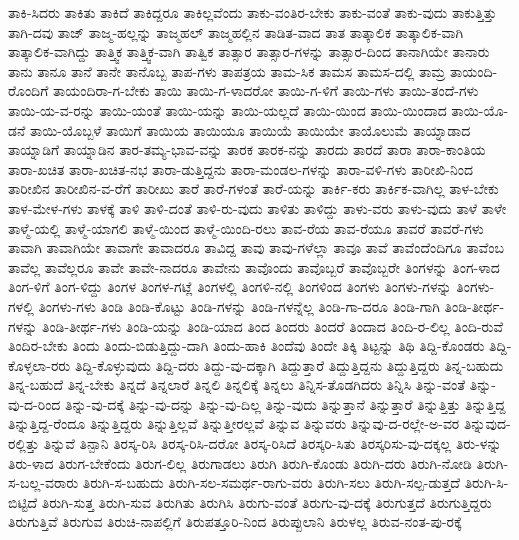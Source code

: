 {ತಾಕಿ-ಸಿದರು
ತಾಕಿತು
ತಾಕಿದೆ
ತಾಕಿದ್ದರೂ
ತಾಕಿಲ್ಲವೆಂದು
ತಾಕು-ವಂತಿರ-ಬೇಕು
ತಾಕು-ವಂತೆ
ತಾಕು-ವುದು
ತಾಕುತ್ತಿತ್ತು
ತಾಗಿ-ದವು
ತಾಜ್
ತಾಜ್ಮ-ಹಲ್ಲನ್ನು
ತಾಜ್ಮಹಲ್
ತಾಜ್ಮಹಲ್ಲಿನ
ತಾಡಿತ-ವಾದ
ತಾತ
ತಾತ್ಕಾಲಿಕ
ತಾತ್ಕಾಲಿಕ-ವಾಗಿ
ತಾತ್ಕಾಲಿಕ-ವಾಗಿದ್ದು
ತಾತ್ತ್ವಿಕ
ತಾತ್ತ್ವಿಕ-ವಾಗಿ
ತಾತ್ವಿಕ
ತಾತ್ಸಾರ
ತಾತ್ಸಾರ-ಗಳನ್ನು
ತಾತ್ಸಾರ-ದಿಂದ
ತಾನಾಗಿಯೇ
ತಾನಾರು
ತಾನು
ತಾನೂ
ತಾನೆ
ತಾನೇ
ತಾನೊಬ್ಬ
ತಾಪ-ಗಳು
ತಾಪತ್ರಯ
ತಾಮ-ಸಿಕ
ತಾಮಸ
ತಾಮಸ-ದಲ್ಲಿ
ತಾಮ್ರ
ತಾಯಂದಿ-ರೊಂದಿಗೆ
ತಾಯಂದಿರಾ-ಗ-ಬೇಕು
ತಾಯಿ
ತಾಯಿ-ಗ-ಳಾದರೋ
ತಾಯಿ-ಗ-ಳಿಗೆ
ತಾಯಿ-ಗಳು
ತಾಯಿ-ತಂದೆ-ಗಳು
ತಾಯಿ-ಯ-ವ-ರನ್ನು
ತಾಯಿ-ಯಂತೆ
ತಾಯಿ-ಯನ್ನು
ತಾಯಿ-ಯಲ್ಲದೆ
ತಾಯಿ-ಯಿಂದ
ತಾಯಿ-ಯಿಂದಾದ
ತಾಯಿ-ಯೊ-ಡನೆ
ತಾಯಿ-ಯೊಬ್ಬಳೆ
ತಾಯಿಗೆ
ತಾಯಿಯ
ತಾಯಿಯೂ
ತಾಯಿಯೆ
ತಾಯಿಯೇ
ತಾಯೊಲುಮೆ
ತಾಯ್ನಾಡಾದ
ತಾಯ್ನಾಡಿಗೆ
ತಾಯ್ನಾಡಿನ
ತಾರ-ತಮ್ಯ-ಭಾವ-ವನ್ನು
ತಾರಕ
ತಾರಕ-ನನ್ನು
ತಾರದು
ತಾರದೆ
ತಾರಾ
ತಾರಾ-ಕಾಂತಿಯ
ತಾರಾ-ಖಚಿತ
ತಾರಾ-ಖಚಿತ-ನಭ
ತಾರಾ-ಡುತ್ತಿದ್ದನು
ತಾರಾ-ಮಂಡಲ-ಗಳನ್ನು
ತಾರಾ-ವಳಿ-ಗಳು
ತಾರೀಖಿ-ನಿಂದ
ತಾರೀಖಿನ
ತಾರೀಖಿನ-ವ-ರೆಗೆ
ತಾರೀಖು
ತಾರೆ
ತಾರೆ-ಗಳಂತೆ
ತಾರೆ-ಯನ್ನು
ತಾರ್ಕಿ-ಕರು
ತಾರ್ಕಿಕ-ವಾಗಿಲ್ಲ
ತಾಳ-ಬೇಕು
ತಾಳ-ಮೇಳ-ಗಳು
ತಾಳಕ್ಕೆ
ತಾಳಿ
ತಾಳಿ-ದಂತೆ
ತಾಳಿ-ರು-ವುದು
ತಾಳಿತು
ತಾಳಿದ್ದು
ತಾಳು-ವರು
ತಾಳು-ವುದು
ತಾಳೆ
ತಾಳೇ
ತಾಳ್ಮೆ-ಯಲ್ಲಿ
ತಾಳ್ಮೆ-ಯಾಗಲಿ
ತಾಳ್ಮೆ-ಯಿಂದ
ತಾಳ್ಮೆ-ಯಿಂದಿ-ರಲು
ತಾವ-ರೆಯ
ತಾವ-ರೆಯೂ
ತಾವರೆ
ತಾವರೆ-ಗಳು
ತಾವಾಗಿ
ತಾವಾಗಿಯೇ
ತಾವಾಗೇ
ತಾವಾದರೂ
ತಾವಿದ್ದ
ತಾವು
ತಾವು-ಗಳೆಲ್ಲಾ
ತಾವೂ
ತಾವೆ
ತಾವೆಂದೆಂದಿಗೂ
ತಾವೆಂಬ
ತಾವೆಲ್ಲ
ತಾವೆಲ್ಲರೂ
ತಾವೇ
ತಾವೇ-ನಾದರೂ
ತಾವೇನು
ತಾವೊಂದು
ತಾವೊಬ್ಬರೆ
ತಾವೊಬ್ಬರೇ
ತಿಂಗಳನ್ನು
ತಿಂಗ-ಳಾದ
ತಿಂಗ-ಳಿಗೆ
ತಿಂಗ-ಳಿದ್ದು
ತಿಂಗಳ
ತಿಂಗಳ-ಗಟ್ಲೆ
ತಿಂಗಳಲ್ಲಿ
ತಿಂಗಳಿ-ನಲ್ಲಿ
ತಿಂಗಳಿಂದ
ತಿಂಗಳು
ತಿಂಗಳು-ಗಳನ್ನು
ತಿಂಗಳು-ಗಳಲ್ಲಿ
ತಿಂಗಳು-ಗಳು
ತಿಂಡಿ
ತಿಂಡಿ-ಕೊಟ್ಟು
ತಿಂಡಿ-ಗಳನ್ನು
ತಿಂಡಿ-ಗಳನ್ನೆಲ್ಲ
ತಿಂಡಿ-ಗಾ-ದರೂ
ತಿಂಡಿ-ಗಾಗಿ
ತಿಂಡಿ-ತೀರ್ಥ-ಗಳನ್ನು
ತಿಂಡಿ-ತೀರ್ಥ-ಗಳು
ತಿಂಡಿ-ಯನ್ನು
ತಿಂಡಿ-ಯಾದ
ತಿಂದ
ತಿಂದರು
ತಿಂದರೆ
ತಿಂದಾದ
ತಿಂದಿ-ರ-ಲಿಲ್ಲ
ತಿಂದಿ-ರುವೆ
ತಿಂದಿರ-ಬೇಕು
ತಿಂದು
ತಿಂದು-ಬಿಡುತ್ತಿದ್ದು-ದಾಗಿ
ತಿಂದು-ಹಾಕಿ
ತಿಂದೆವು
ತಿಂದೇ
ತಿಕ್ಕಿ
ತಿಟ್ಟನ್ನು
ತಿಥಿ
ತಿದ್ದಿ-ಕೊಂಡರು
ತಿದ್ದಿ-ಕೊಳ್ಳಲಾ-ರರು
ತಿದ್ದಿ-ಕೊಳ್ಳುವುದು
ತಿದ್ದಿ-ದರು
ತಿದ್ದು-ವು-ದಕ್ಕಾಗಿ
ತಿದ್ದುತ್ತಾರೆ
ತಿದ್ದುತ್ತಿದ್ದನು
ತಿದ್ದುತ್ತಿದ್ದರು
ತಿನ್ನ-ಬಹುದು
ತಿನ್ನ-ಬಹುದೆ
ತಿನ್ನ-ಬೇಕು
ತಿನ್ನದೆ
ತಿನ್ನಲಾರೆ
ತಿನ್ನಲಿ
ತಿನ್ನಲಿಕ್ಕೆ
ತಿನ್ನಲು
ತಿನ್ನಿಸ-ತೊಡಗಿದರು
ತಿನ್ನಿಸಿ
ತಿನ್ನು-ವಂತೆ
ತಿನ್ನು-ವು-ದ-ರಿಂದ
ತಿನ್ನು-ವು-ದಕ್ಕೆ
ತಿನ್ನು-ವು-ದನ್ನು
ತಿನ್ನು-ವು-ದಿಲ್ಲ
ತಿನ್ನು-ವುದು
ತಿನ್ನುತ್ತಾನೆ
ತಿನ್ನುತ್ತಾರೆ
ತಿನ್ನುತ್ತಿತ್ತು
ತಿನ್ನುತ್ತಿದ್ದ
ತಿನ್ನುತ್ತಿದ್ದ-ರೆಂದೂ
ತಿನ್ನುತ್ತಿದ್ದರು
ತಿನ್ನುತ್ತಿಲ್ಲವೆ
ತಿನ್ನುತ್ತೀರಲ್ಲವೆ
ತಿನ್ನುವ
ತಿನ್ನುವರು
ತಿನ್ನುವು-ದ-ರಲ್ಲೇ-ಅ-ವರ
ತಿನ್ನುವುದ-ರಲ್ಲಿತ್ತು
ತಿನ್ನುವೆ
ತಿನ್ಪಾನಿ
ತಿರಸ್ಕ-ರಿಸಿ
ತಿರಸ್ಕ-ರಿಸಿ-ದರೋ
ತಿರಸ್ಕ-ರಿಸಿದೆ
ತಿರಸ್ಕರಿ-ಸಿತು
ತಿರಸ್ಕರಿಸು-ವು-ದಕ್ಕಲ್ಲ
ತಿರು-ಳನ್ನು
ತಿರು-ಳಾದ
ತಿರುಗ-ಬೇಕೆಂದು
ತಿರುಗ-ಲಿಲ್ಲ
ತಿರುಗಾಡಲು
ತಿರುಗಿ
ತಿರುಗಿ-ಕೊಂಡು
ತಿರುಗಿ-ದರು
ತಿರುಗಿ-ನೋಡಿ
ತಿರುಗಿ-ಸ-ಬಲ್ಲ-ವರಾರು
ತಿರುಗಿ-ಸ-ಬಹುದು
ತಿರುಗಿ-ಸಲ-ಸಮರ್ಥ-ರಾಗು-ವರು
ತಿರುಗಿ-ಸಲು
ತಿರುಗಿ-ಸಲ್ಪ-ಡುತ್ತದೆ
ತಿರುಗಿ-ಸಿ-ಬಿಟ್ಟಿದೆ
ತಿರುಗಿ-ಸುತ್ತ
ತಿರುಗಿ-ಸುವ
ತಿರುಗಿತು
ತಿರುಗಿಸಿ
ತಿರುಗು-ವಂತೆ
ತಿರುಗು-ವು-ದಕ್ಕೆ
ತಿರುಗುತ್ತದೆ
ತಿರುಗುತ್ತಿದ್ದರು
ತಿರುಗುತ್ತಿವೆ
ತಿರುಗುವ
ತಿರುಚಿ-ನಾಪಲ್ಲಿಗೆ
ತಿರುಪತ್ತೂರಿ-ನಿಂದ
ತಿರುಪ್ಪುಲಾನಿ
ತಿರುಳಲ್ಲ
ತಿರುವ-ನಂತ-ಪು-ರಕ್ಕೆ
}
